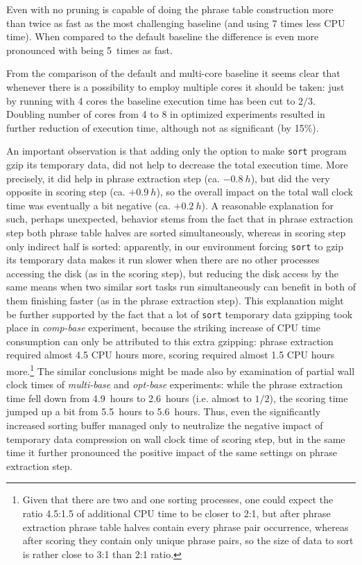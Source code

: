 Even with no pruning \eppex{} is capable of doing the phrase table construction more
than twice as fast as the most challenging baseline (and using 7 times less CPU time).
When compared to the default baseline the difference is even more pronounced with \eppex{}
being 5~times as fast.

From the comparison of the default and multi-core baseline it seems clear that whenever there
is a possibility to employ multiple cores it should be taken: just by running with 4 cores
the baseline execution time has been cut to $2/3$.
Doubling number of cores from 4 to 8 in optimized experiments resulted in further reduction
of execution time, although not as significant (by 15\%).

An important observation is that adding only the option to make \texttt{sort} program gzip
its temporary data, did not help to decrease the total execution time.
More precisely, it did help in phrase extraction step (ca. $-0.8~h$), but did the very opposite
in scoring step (ca. $+0.9~h$), so the overall impact on the total wall clock time was eventually
a bit negative (ca. $+0.2~h$).
A reasonable explanation for such, perhaps unexpected, behavior stems from the fact that in phrase
extraction step both phrase table halves are sorted simultaneously, whereas in scoring step
only indirect half is sorted:
apparently, in our environment forcing \texttt{sort} to gzip its temporary data makes it run
slower when there are no other processes accessing the disk (as in the scoring step), but reducing
the disk access by the same means when two similar sort tasks run simultaneously can benefit
in both of them finishing faster (as in the phrase extraction step).
This explanation might be further supported by the fact that a lot of \texttt{sort} temporary
data gzipping took place in \emph{comp-base} experiment, because the striking increase of CPU time
consumption can only be attributed to this extra gzipping: %
phrase extraction required almost 4.5 CPU hours more, scoring required almost 1.5 CPU hours
more.\footnote{Given that there are two and one sorting processes, one could expect the ratio
4.5:1.5 of additional CPU time to be closer to 2:1, but after phrase extraction phrase table halves
contain every phrase pair occurrence, whereas after scoring they contain only unique phrase pairs,
so the size of data to sort is rather close to 3:1 than 2:1 ratio.}
The similar conclusions might be made also by examination of partial wall clock times of \emph{multi-base}
and \emph{opt-base} experiments: while the phrase extraction time fell down from 4.9~hours to 2.6~hours
(i.e. almost to $1/2$), the scoring time jumped up a bit from 5.5~hours to 5.6~hours.
Thus, even the significantly increased sorting buffer managed only to neutralize the negative impact of
temporary data compression on wall clock time of scoring step, but in the same time it further pronounced
the positive impact of the same settings on phrase extraction step.

